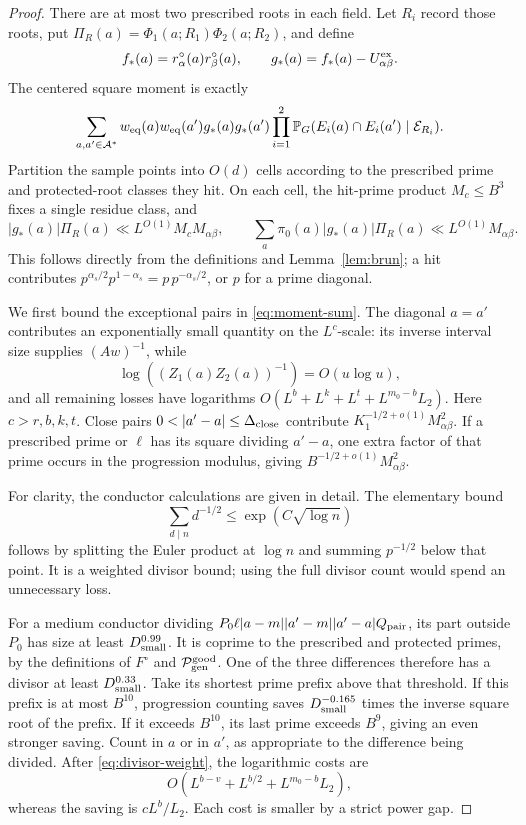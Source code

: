 \begin{proof}
There are at most two prescribed roots in each field.  Let \(R_i\)
record those roots, put
\(\Pi_R(a)=\Phi_1(a;R_1)\Phi_2(a;R_2)\), and define
\[
 f_*(a)=r^\circ_\alpha(a)r^\circ_\beta(a),\qquad
 g_*(a)=f_*(a)-U^{\rm ex}_{\alpha\beta}.
\]
The centered square moment is exactly
\begin{equation}\label{eq:moment-sum}
 \sum_{a,a'\in\mathcal A^*}
   w_{\rm eq}(a)w_{\rm eq}(a')g_*(a)g_*(a')
   \prod_{i=1}^2
      \mathbb P_G(E_i(a)\cap E_i(a')\mid\mathcal E_{R_i}).
\end{equation}
Partition the sample points into \(O(d)\) cells according to the
prescribed prime and protected-root classes they hit.  On each cell,
the hit-prime product \(M_c\le B^3\) fixes a single residue class,
and
\begin{equation}\label{eq:cell-bounds}
 |g_*(a)|\Pi_R(a)\ll L^{O(1)}M_cM_{\alpha\beta},\qquad
 \sum_a\pi_0(a)|g_*(a)|\Pi_R(a)\ll L^{O(1)}M_{\alpha\beta}.
\end{equation}
This follows directly from the definitions and
Lemma~\ref{lem:brun}; a hit contributes
\(p^{\alpha_s/2}p^{1-\alpha_s}=p\,p^{-\alpha_s/2}\), or \(p\)
for a prime diagonal.

We first bound the exceptional pairs in \eqref{eq:moment-sum}.
The diagonal \(a=a'\) contributes an exponentially small quantity
on the \(L^c\)-scale: its inverse interval size supplies
\((Aw)^{-1}\), while
\[
 \log((Z_1(a)Z_2(a))^{-1})=O(u\log u),
\]
and all remaining losses have logarithms
\(O(L^b+L^k+L^t+L^{m_0-b}L_2)\).  Here \(c>r,b,k,t\).
Close pairs \(0<|a'-a|\le\Delta_{\rm close}\) contribute
\(K_1^{-1/2+o(1)}M_{\alpha\beta}^2\).  If a prescribed prime or
\(\ell\) has its square dividing \(a'-a\), one extra factor of
that prime occurs in the progression modulus, giving
\(B^{-1/2+o(1)}M_{\alpha\beta}^2\).

For clarity, the conductor calculations are given in detail.  The
elementary bound
\begin{equation}\label{eq:divisor-weight}
 \sum_{d\mid n}d^{-1/2}\le\exp(C\sqrt{\log n})
\end{equation}
follows by splitting the Euler product at \(\log n\) and summing
\(p^{-1/2}\) below that point.  It is a weighted divisor bound;
using the full divisor count would spend an unnecessary loss.

For a medium conductor dividing
\(P_0\ell|a-m||a'-m||a'-a|Q_{\rm pair}\), its part outside
\(P_0\) has size at least \(D_{\rm small}^{0.99}\).  It is
coprime to the prescribed and protected primes, by the definitions
of \(F^\circ\) and \(\mathcal P_{\rm gen}^{\rm good}\).
One of the three differences therefore has a divisor at least
\(D_{\rm small}^{0.33}\).  Take its shortest prime prefix above
that threshold.  If this prefix is at most \(B^{10}\), progression
counting saves
\(D_{\rm small}^{-0.165}\) times the inverse square root of the
prefix.  If it exceeds \(B^{10}\), its last prime exceeds \(B^9\),
giving an even stronger saving.  Count in \(a\) or in \(a'\),
as appropriate to the difference being divided.  After
\eqref{eq:divisor-weight}, the logarithmic costs are
\[
 O(L^{b-v}+L^{b/2}+L^{m_0-b}L_2),
\]
whereas the saving is \(cL^b/L_2\).  Each cost is smaller by a
strict power gap.


\end{proof}

